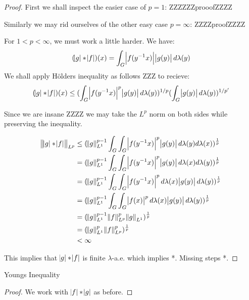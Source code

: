 \begin{proof}
First we shall inspect the easier case of $p=1$:
ZZZZZZprooofZZZZ


Similarly we may rid ourselves of the other easy case $p=\infty$:
ZZZZproofZZZZ

For $ 1 < p < \infty$, we must work a little harder. We have:
\begin{equation*}
(\abs{g} \ast \abs{f} )(x) = \int_G \abs{f(y^{-1}x)}\abs{g(y)} d\lambda(y)
\end{equation*}
We shall apply H\"olders inequality as follows ZZZ to recieve:
\begin{equation*}
(\abs{g} \ast \abs{f} )(x) \leq (\int_G \abs{f(y^{-1}x)}^p \abs{g(y)} d\lambda(y))^{1/p} (\int_G \abs{g(y)} d\lambda(y))^{1/p'}
\end{equation*}

Since we are insane ZZZZ we may take the $L^p$ norm on both sides while preserving the inequality.

\begin{align*}
\norm{\abs{g} \ast \abs{f}}_{L^p} &\leq (\norm{g}^{p-1}_{L^1} \int_G \int_G \abs{f(y^{-1}x)}^p \abs{g(y)} d\lambda(y)d\lambda(x) )^\frac{1}{p} \\
&= (\norm{g}^{p-1}_{L^1} \int_G \int_G \abs{f(y^{-1}x)}^p \abs{g(y)} d\lambda(x)d\lambda(y) )^\frac{1}{p} \\
&= (\norm{g}^{p-1}_{L^1} \int_G \int_G \abs{f(y^{-1}x)}^p  d\lambda(x) \abs{g(y)} d\lambda(y) )^\frac{1}{p} \\
&= (\norm{g}^{p-1}_{L^1} \int_G \int_G \abs{f(x)}^p  d\lambda(x) \abs{g(y)} d\lambda(y) )^\frac{1}{p} \\
&= (\norm{g}^{p-1}_{L^1} \norm{f}^p_{L^p} \norm{g}_{L^1})^\frac{1}{p} \\
&= (\norm{g}^{p}_{L^1} \norm{f}^p_{L^p})^\frac{1}{p} \\
&< \infty
\end{align*}

This implies that $\abs{g}\ast\abs{f}$ is finite $\lambda$-a.e. which implies *. Missing steps *.

\end{proof}

\begin{theorem}
Youngs Inequality
\end{theorem}

\begin{proof}
We work with $\abs{f} \ast \abs{g}$ as before. 
\end{proof}


